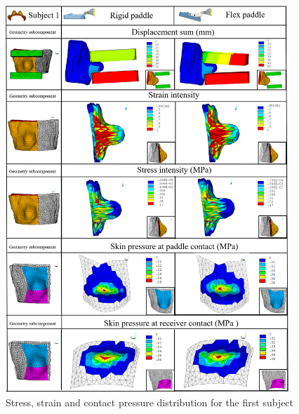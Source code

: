 \begin{figure}[!h]
\centering
\includegraphics[width=0.95\textwidth,keepaspectratio]{figures/subject1_compressionResults.png} 
\caption{Stress, strain and contact pressure distribution for the first subject}\label{fig:subject1_compressionResults}
\end{figure}

